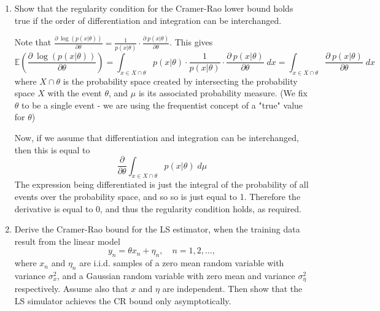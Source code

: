 \documentclass{article}
\newcommand{\chapternumber}{3}
\newenvironment{QandA}{\begin{enumerate}[label=\chapternumber.\arabic*]\bfseries\boldmath}
	{\end{enumerate}}
\newenvironment{answered}{\par\bigskip\normalfont\unboldmath}{}
\begin{document}
\begin{QandA}
		\item Show that the regularity condition for the Cramer-Rao lower bound holds true if the order of differentiation and integration can be interchanged.
		\begin{answered}
			Note that $\frac{\partial\:\log (p(x|\theta))}{\partial \theta} = \frac{1}{p(x|\theta)}\cdot\frac{\partial\:p(x|\theta)}{\partial \theta}$. This gives \[\mathbb{E}\left(\frac{\partial\:\log (p(x|\theta))}{\partial \theta}\right)=\int_{x\in X\cap\theta} p(x|\theta)\cdot\frac{1}{p(x|\theta)}\cdot\frac{\partial\:p(x|\theta)}{\partial \theta}\;dx=\int_{x\in X\cap\theta}\frac{\partial\:p(x|\theta)}{\partial \theta}\;dx\]
			where $X\cap\theta$ is the probability space created by intersecting the probability space $X$ with the event $\theta$, and $\mu$ is its associated probability measure. (We fix $\theta$ to be a single event - we are using the frequentist concept of a "true" value for $\theta$)
			
			Now, if we assume that differentiation and integration can be interchanged, then this is equal to
			\[\frac{\partial}{\partial\theta}\int_{x\in X\cap\theta}p(x|\theta)\;d\mu\]
			The expression being differentiated is just the integral of the probability of all events over the probability space, and so so is just equal to 1. Therefore the derivative is equal to 0, and thus the regularity condition holds, as required.
		\end{answered}
	
		\item Derive the Cramer-Rao bound for the LS estimator, when the training data result from the linear model
		\[y_n=\theta x_n+\eta_n,\quad n=1,2,...,\]
		where $x_n$ and $\eta_n$ are i.i.d. samples of a zero mean random variable with variance $\sigma_x^2$, and a Gaussian random variable with zero mean and variance $\sigma_\eta^2$ respectively. Assume also that $x$ and $\eta$ are independent. Then show that the LS simulator achieves the CR bound only asymptotically.
		

\end{QandA}
\end{document}
